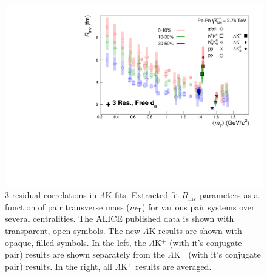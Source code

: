 \documentclass[../AnalysisNoteJBuxton.tex]{subfiles}
\begin{document}

\begin{figure}[h]
  \centering
  \includegraphics[width=\textwidth]{7_ResultsAndDiscussion/Figures/mTscaling_MinvCalc_OutlinedPoints_OthersTransparent_3Res_FreeD0.pdf}
  \caption[$m_{\mathrm{T}}$ Scaling of Radii: 3 Residuals in Fit]{3 residual correlations in $\Lambda$K fits.  Extracted fit $R_{\mathrm{inv}}$ parameters as a function of pair transverse mass ($m_{\mathrm{T}}$) for various pair systems over several centralities. The ALICE published data \cite{Adam:2015vja} is shown with transparent, open symbols.  The new $\Lambda$K results are shown with opaque, filled symbols.  In the left, the $\Lambda$K$^{+}$ (with it's conjugate pair) results are shown separately from the $\Lambda$K$^{-}$ (with it's conjugate pair) results.  In the right, all $\Lambda$K$^{\pm}$ results are averaged.}
  \label{fig:mTScalingOfRadii_3Res}
\end{figure}

\clearpage
\end{document}
